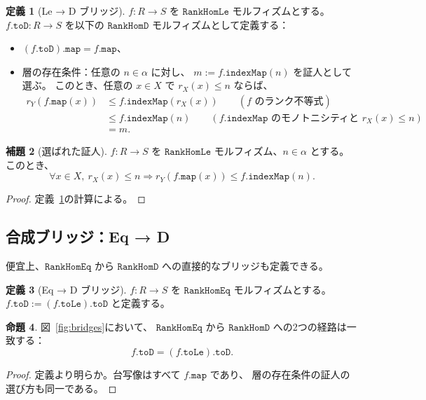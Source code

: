 \documentclass[11pt,a4paper,ja=standard]{bxjsarticle}
\theoremstyle{definition}
\newtheorem{definition}{定義}[section]
\newtheorem{lemma}[definition]{補題}
\newtheorem{proposition}[definition]{命題}
\newcommand{\RankHomLe}{\mathtt{RankHomLe}}
\newcommand{\RankHomEq}{\mathtt{RankHomEq}}
\newcommand{\RankHomD}{\mathtt{RankHomD}}
\begin{document}
\begin{definition}[Le → D ブリッジ]\label{def:le-to-d}
$f : R \to S$ を $\RankHomLe$ モルフィズムとする。
$f.\mathtt{toD} : R \to S$ を以下の $\RankHomD$ モルフィズムとして定義する：
\begin{itemize}
\item $(f.\mathtt{toD}).\mathtt{map} = f.\mathtt{map}$、
\item 層の存在条件：任意の $n \in \alpha$ に対し、
$m := f.\mathtt{indexMap}(n)$ を証人として選ぶ。
このとき、任意の $x \in X$ で $r_X(x) \le n$ ならば、
\begin{align*}
r_Y(f.\mathtt{map}(x))
&\le f.\mathtt{indexMap}(r_X(x))
  \qquad (\text{$f$ のランク不等式}) \\
&\le f.\mathtt{indexMap}(n)
  \qquad (\text{$f.\mathtt{indexMap}$ のモノトニシティと $r_X(x) \le n$}) \\
&= m.
\end{align*}
\end{itemize}
\end{definition}

\begin{lemma}[選ばれた証人]
$f : R \to S$ を $\RankHomLe$ モルフィズム、$n \in \alpha$ とする。
このとき、
\[
  \forall x \in X,\ r_X(x) \le n
  \Rightarrow r_Y(f.\mathtt{map}(x)) \le f.\mathtt{indexMap}(n).
\]
\end{lemma}

\begin{proof}
定義~\ref{def:le-to-d}の計算による。
\end{proof}

\subsection{合成ブリッジ：Eq → D}

便宜上、$\RankHomEq$ から $\RankHomD$ への直接的なブリッジも定義できる。

\begin{definition}[Eq → D ブリッジ]
$f : R \to S$ を $\RankHomEq$ モルフィズムとする。
$f.\mathtt{toD} := (f.\mathtt{toLe}).\mathtt{toD}$
と定義する。
\end{definition}

\begin{proposition}
図~\ref{fig:bridges}において、
$\RankHomEq$ から $\RankHomD$ への2つの経路は一致する：
\[
  f.\mathtt{toD} = (f.\mathtt{toLe}).\mathtt{toD}.
\]
\end{proposition}

\begin{proof}
定義より明らか。台写像はすべて $f.\mathtt{map}$ であり、
層の存在条件の証人の選び方も同一である。
\end{proof}
\end{document}

